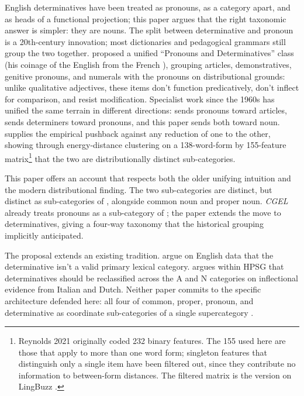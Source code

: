 \documentclass[12pt]{article}
\begin{document}
English determinatives have been treated as pronouns, as a category apart, and as heads of a functional projection; this paper argues that the right taxonomic answer is simpler: they are nouns. The split between determinative and pronoun is a 20th-century innovation; most dictionaries and pedagogical grammars still group the two together. \textcite{palmer1924} proposed a unified \enquote{Pronouns and Determinatives} class (his coinage of the English  from the French ), grouping articles, demonstratives, genitive pronouns, and numerals with the pronouns on distributional grounds: unlike qualitative adjectives, these items don't function predicatively, don't inflect for comparison, and resist modification. Specialist work since the 1960s has unified the same terrain in different directions: \citet{postal1966} sends pronouns toward articles, \citet{hudson2004determiners} sends determiners toward pronouns, and this paper sends both toward noun. \citet{reynolds2021} supplies the empirical pushback against any reduction of one to the other, showing through energy-distance clustering on a 138-word-form by 155-feature matrix\footnote{Reynolds 2021 originally coded 232 binary features. The 155 used here are those that apply to more than one word form; singleton features that distinguish only a single item have been filtered out, since they contribute no information to between-form distances. The filtered matrix is the version on LingBuzz \citep{reynolds2021matrix}.} that the two are distributionally distinct sub-categories.

This paper offers an account that respects both the older unifying intuition and the modern distributional finding. The two sub-categories are distinct, but distinct as sub-categories of , alongside common noun and proper noun. \textit{CGEL} \citep{huddleston2002} already treats pronouns as a sub-category of ; the paper extends the move to determinatives, giving a four-way taxonomy that the historical grouping implicitly anticipated.

The proposal extends an existing tradition. \textcite{spinillo2000determiners,spinillo2004reconceptualising} argue on English data that the determinative isn't a valid primary lexical category. \textcite{vaneynde2003determiner} argues within HPSG that determinatives should be reclassified across the A and N categories on inflectional evidence from Italian and Dutch. Neither paper commits to the specific architecture defended here: all four of common, proper, pronoun, and determinative as coordinate sub-categories of a single supercategory .
\end{document}
